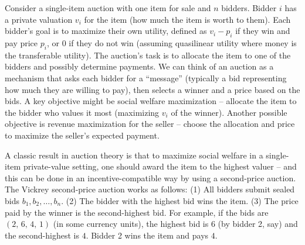\documentclass[
  letterpaper,
  numbers=noenddot,
  DIV=11]{scrreprt}
\theoremstyle{plain}
\theoremstyle{definition}
\theoremstyle{remark}
\begin{document}
Consider a single-item auction with one item for sale and \(n\) bidders.
Bidder \(i\) has a private valuation \(v_i\) for the item (how much the
item is worth to them). Each bidder's goal is to maximize their own
utility, defined as \(v_i - p_i\) if they win and pay price \(p_i\), or
\(0\) if they do not win (assuming quasilinear utility where money is
the transferable utility). The auction's task is to allocate the item to
one of the bidders and possibly determine payments. We can think of an
auction as a mechanism that asks each bidder for a ``message''
(typically a bid representing how much they are willing to pay), then
selects a winner and a price based on the bids. A key objective might be
social welfare maximization -- allocate the item to the bidder who
values it most (maximizing \(v_i\) of the winner). Another possible
objective is revenue maximization for the seller -- choose the
allocation and price to maximize the seller's expected payment.

A classic result in auction theory is that to maximize social welfare in
a single-item private-value setting, one should award the item to the
highest valuer -- and this can be done in an incentive-compatible way by
using a second-price auction. The Vickrey second-price auction works as
follows: (1) All bidders submit sealed bids \(b_1, b_2, \ldots, b_n\).
(2) The bidder with the highest bid wins the item. (3) The price paid by
the winner is the second-highest bid. For example, if the bids are
\((2,\, 6,\, 4,\, 1)\) (in some currency units), the highest bid is
\(6\) (by bidder 2, say) and the second-highest is \(4\). Bidder 2 wins
the item and pays \(4\).
\end{document}

